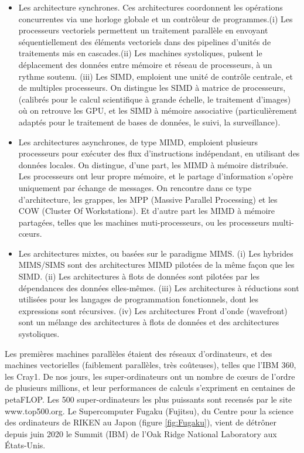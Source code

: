 \documentclass[a4paper,12pt]{report}
\theoremstyle{plain}				%
\theoremstyle{definition}				%
\newcommand{\tdi}[1]{\todo[inline]{{#1}}{}}
\newcommand{\lp}[1]{\todo[author=LP,color=yellow,inline]{#1}}
\begin{document}
\begin{itemize}
\item Les architecture synchrones.
  Ces architectures coordonnent les opérations concurrentes via une
  horloge globale et un contrôleur de programmes.(i) Les processeurs
  vectoriels permettent un traitement parallèle en envoyant
  séquentiellement des éléments vectoriels dans des pipelines d'unités
  de traitements mis en cascades.(ii) Les machines systoliques,
  pulsent le déplacement des données entre mémoire et réseau de
  processeurs, à un rythme soutenu.
  (iii) Les SIMD, emploient une unité de contrôle centrale, et de
  multiples processeurs.
  On distingue les SIMD à matrice de processeurs, (calibrés pour le
  calcul scientifique à grande échelle, le traitement d'images) où on
  retrouve les GPU, et les SIMD à mémoire associative
  (particulièrement adaptés pour le traitement de bases de données, le
  suivi, la surveillance).
\item Les architectures asynchrones, de type MIMD, emploient plusieurs
  processeurs pour exécuter des flux d'instructions indépendant, en
  utilisant des données locales.
  On distingue, d'une part, les MIMD à mémoire distribuée.
  Les processeurs ont leur propre mémoire, et le partage d'information
  s'opère uniquement par échange de messages.
  On rencontre dans ce type d'architecture, les grappes, les MPP
  (Massive Parallel Processing) et les COW (Cluster Of Workstations).
  Et d'autre part les MIMD à mémoire partagées, telles que les
  machines muti-processeurs, ou les processeurs multi-c\oe{}urs.
  \lp{Dire que c'est le contexte de ton travail ?}
\item Les architectures mixtes, ou basées sur le paradigme MIMS.
  (i) Les hybrides MIMS/SIMS sont des architectures MIMD pilotées de
  la même façon que les SIMD.
  (ii) Les architectures à flots de données sont pilotées par les
  dépendances des données elles-mêmes.
  (iii) Les architectures à réductions sont utilisées pour les langages
  de programmation fonctionnels, dont les expressions sont récursives.
  (iv) Les architectures Front d'onde (wavefront) sont un mélange des
  architectures à flots de données et des architectures systoliques.

\end{itemize}



Les premières machines parallèles étaient des réseaux
d'ordinateurs, et des machines vectorielles (faiblement
parallèles, très coûteuses), telles que l'IBM 360, les
Cray1. 
De nos jours, les super-ordinateurs ont un nombre de c\oe{}urs de l'ordre de plusieurs millions, et leur performances de calculs s'expriment 
en centaines de petaFLOP. Les 500 super-ordinateurs les plus puissants 
sont recensés par le site www.top500.org. 
Le Supercomputer Fugaku (Fujitsu), du Centre pour la science 
des ordinateurs de RIKEN au Japon (figure \ref{fig:Fugaku}), 
vient de détrôner depuis juin 2020 le Summit (IBM) 
de l’Oak Ridge National Laboratory aux États-Unis.
\end{document}
